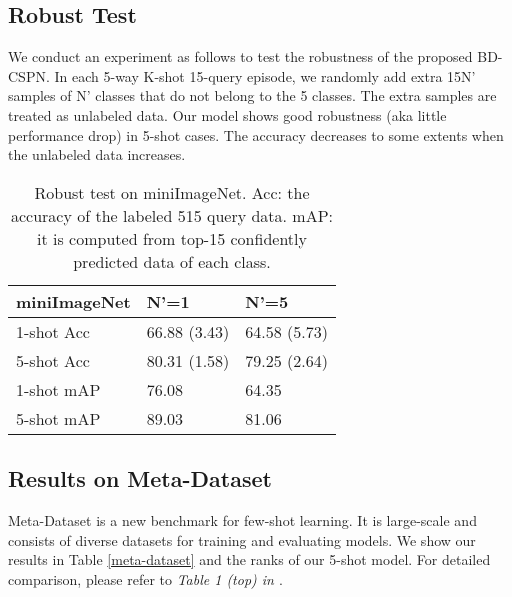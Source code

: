 \documentclass[runningheads]{llncs}
\begin{document}
\subsection{Robust Test}
We conduct an experiment as follows to test the robustness of the proposed BD-CSPN. In each 5-way K-shot 15-query episode, we randomly add extra 15N' samples of N' classes that do not belong to the 5 classes. The extra samples are treated as unlabeled data. Our model shows good robustness (aka little performance drop) in 5-shot cases. The accuracy decreases to some extents when the unlabeled data increases.



\begin{table}
\centering
\caption{Robust test on miniImageNet. Acc: the accuracy of the labeled 515 query data. mAP: it is computed from top-15 confidently predicted data of each class.}
\begin{tabular}{lll}
\toprule
{\textbf{miniImageNet}} & {\textbf{N'=1}}           & {\textbf{N'=5}}           \\ \midrule
{1-shot Acc}            & {66.88 (3.43)} & {64.58 (5.73)} \\
{5-shot Acc}            & {80.31 (1.58)} & {79.25 (2.64)}  \\ 
1-shot mAP & 76.08 & 64.35  \\
5-shot mAP & 89.03 & 81.06  \\
\midrule
\end{tabular}
\end{table}

  


\subsection{Results on Meta-Dataset}
Meta-Dataset \cite{triantafillou2020meta} is a new benchmark for few-shot learning. It is large-scale and consists of diverse datasets for training and evaluating models. We show our results in Table \ref{meta-dataset} and the ranks of our 5-shot model. For detailed comparison, please refer to \textit{Table 1 (top) in \cite{triantafillou2020meta}}.
\end{document}

